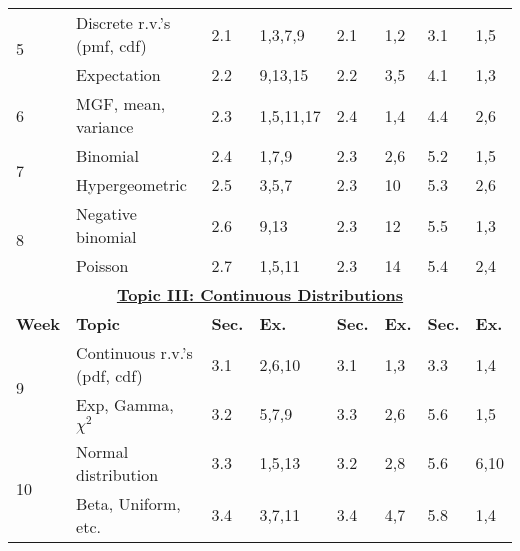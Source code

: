 \documentclass[12pt]{article}
\begin{document}
\begin{landscape}
\begin{table}[htbp]
\begin{tabular}{%
    p{1.2cm}   %
    p{5cm}     %
    p{1cm}p{4cm}  %
    p{1cm}p{3.2cm}  %
    p{1cm}p{2.7cm}  %
  }
\multirow{2}{*}{5} &
Discrete r.v.’s (pmf, cdf)      & 2.1       & 1,3,7,9       & 2.1       & 1,2       & 3.1       & 1,5\\[2pt]
& Expectation                   & 2.2       & 9,13,15       & 2.2       & 3,5       & 4.1       & 1,3\\[10pt]
    
6 & MGF, mean, variance         & 2.3       & 1,5,11,17     & 2.4       & 1,4       & 4.4       & 2,6\\[10pt]
    
\multirow{2}{*}{7}
    & Binomial                  & 2.4       & 1,7,9         & 2.3       & 2,6       & 5.2       & 1,5\\[2pt]
    & Hypergeometric            & 2.5       & 3,5,7         & 2.3       & 10        & 5.3       & 2,6\\[10pt]
    
\multirow{2}{*}{8}
    & Negative binomial         & 2.6       & 9,13          & 2.3       & 12        & 5.5       & 1,3\\[2pt]
    & Poisson                   & 2.7       & 1,5,11        & 2.3       & 14        & 5.4       & 2,4\\[2pt]
\midrule
\multicolumn{8}{c}{\textbf{\underline{Topic III: Continuous Distributions}}}\\[2pt]
\textbf{Week}   &
\textbf{Topic}  &
\textbf{Sec.}   & \textbf{Ex.} &
\textbf{Sec.}   & \textbf{Ex.} &
\textbf{Sec.}   & \textbf{Ex.}\\
\midrule
\multirow{2}{*}{9} &
Continuous r.v.’s (pdf, cdf)    & 3.1       & 2,6,10        & 3.1       & 1,3     & 3.3       & 1,4\\[2pt]
& Exp, Gamma, $\chi^{2}$        & 3.2       & 5,7,9         & 3.3       & 2,6     & 5.6       & 1,5\\[10pt]

\multirow{2}{*}{10} &
    Normal distribution         & 3.3       & 1,5,13        & 3.2       & 2,8     & 5.6       & 6,10\\[2pt]
    & Beta, Uniform, etc.       & 3.4       & 3,7,11        & 3.4       & 4,7     & 5.8       & 1,4\\[2pt]
\bottomrule
\end{tabular}
\end{table}
\end{landscape}
\end{document}

